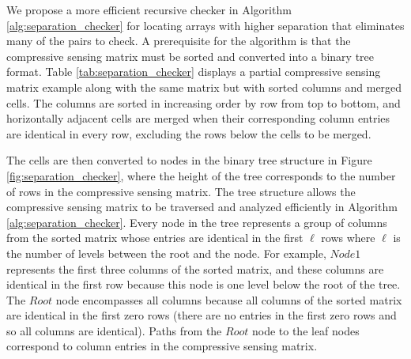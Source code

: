 We propose a more efficient recursive checker in Algorithm \ref{alg:separation_checker} for locating arrays with higher separation that eliminates many of the pairs to check.
A prerequisite for the algorithm is that the compressive sensing matrix must be sorted and converted into a binary tree format.
Table \ref{tab:separation_checker} displays a partial compressive sensing matrix example along with the same matrix but with sorted columns and merged cells.
The columns are sorted in increasing order by row from top to bottom, and horizontally adjacent cells are merged when their corresponding column entries are identical in every row, excluding the rows below the cells to be merged.

The cells are then converted to nodes in the binary tree structure in Figure \ref{fig:separation_checker}, where the height of the tree corresponds to the number of rows in the compressive sensing matrix.
The tree structure allows the compressive sensing matrix to be traversed and analyzed efficiently in Algorithm \ref{alg:separation_checker}.
Every node in the tree represents a group of columns from the sorted matrix whose entries are identical in the first $\ell$ rows where $\ell$ is the number of levels between the root and the node.
For example, $\mathit{Node1}$ represents the first three columns of the sorted matrix, and these columns are identical in the first row because this node is one level below the root of the tree.
The $\mathit{Root}$ node encompasses all columns because all columns of the sorted matrix are identical in the first zero rows (there are no entries in the first zero rows and so all columns are identical).
Paths from the $\mathit{Root}$ node to the leaf nodes correspond to column entries in the compressive sensing matrix.


